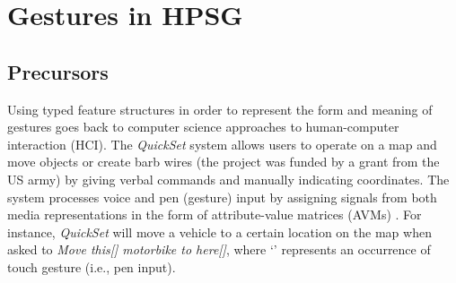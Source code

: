 \documentclass[output=paper]{langsci/langscibook}
\begin{document}
\section{Gestures in HPSG}
\label{sec:gestures-hpsg}

\subsection{Precursors} 
\label{sec:precursors}

Using typed feature structures in order to represent the form and meaning of gestures goes back to computer science approaches to human-computer interaction (HCI). %
%
The \textit{QuickSet} system \citep{Cohen:et:al:1997} allows users to operate on a map and move objects or create barb wires (the project was funded by a grant from the US army) by giving verbal commands and manually indicating coordinates.
%
The system processes voice and pen (gesture) input by assigning signals from both media representations in the form of attribute-value matrices (AVMs) \citep{Johnston:1998,Johnston:et:al:1997}.
%
%
For instance, \textit{QuickSet} will move a vehicle to a certain location on the map when asked to \emph{Move this[\Pointing] motorbike to here[\Pointing]}, where \enquote*{\Pointing} represents an occurrence of touch gesture (i.e., pen input). 
\end{document}
